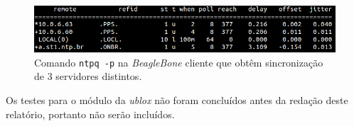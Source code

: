 \begin{figure}[h!]
    
    \centering
    \includegraphics[scale=0.6]{image/cliente-ntp}
    \caption {Comando \texttt{ntpq -p} na \textit{BeagleBone} cliente que obtêm sincronização de 3 servidores distintos.}
    \label{img:cliente_ntp} 
\end{figure} 

Os testes para o módulo da \textit{ublox} não foram concluídos antes da redação
deste relatório, portanto não serão incluídos.

